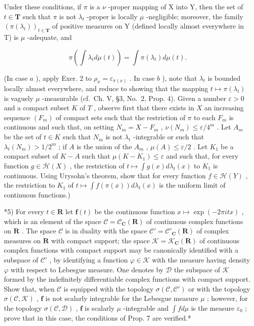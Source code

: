 Under these conditions, if \(\pi\) is a \(\nu\) -proper mapping of X into Y, then the set of \(t \in \mathbf{T}\) such that \(\pi\) is not \(\lambda_t\) -proper is locally \(\mu\) -negligible; moreover, the family \((\pi(\lambda_t))_{t \in \mathbf{T}}\) of positive measures on Y (defined locally almost everywhere in T) is \(\mu\) -adequate, and

\[
\pi \left(\int \lambda_ {t} d \mu (t)\right) = \int \pi (\lambda_ {t}) d \mu (t).
\]

(In case \(a\) ), apply Exer. 2 to \(\rho_x = \varepsilon_{\pi(x)}\) . In case \(b\) ), note that \(\lambda_t\) is bounded locally almost everywhere, and reduce to showing that the mapping \(t \mapsto \pi(\lambda_t)\) is vaguely \(\mu\) -measurable (cf.~Ch. V, §3, No.~2, Prop. 4). Given a number \(\varepsilon > 0\) and a compact subset \(K\) of \(T\) , observe first that there exists in \(X\) an increasing sequence \((F_m)\) of compact sets such that the restriction of \(\pi\) to each \(F_m\) is continuous and such that, on setting \(N_m = X - F_m\) , \(\nu(N_m) \leqslant \varepsilon/4^m\) . Let \(A_m\) be the set of \(t \in K\) such that \(N_m\) is not \(\lambda_t\) -integrable or such that \(\lambda_t(N_m) > 1/2^m\) ; if \(A\) is the union of the \(A_m\) , \(\mu(A) \leqslant \varepsilon/2\) . Let \(K_1\) be a compact subset of \(K - A\) such that \(\mu(K - K_1) \leqslant \varepsilon\) and such that, for every function \(g \in \mathcal{H}(X)\) , the restriction of \(t \mapsto \int g(x) d\lambda_t(x)\) to \(K_1\) is continuous. Using Urysohn's theorem, show that for every function \(f \in \mathcal{H}(Y)\) , the restriction to \(K_1\) of \(t \mapsto \int f(\pi(x)) d\lambda_t(x)\) is the uniform limit of continuous functions.)

*5) For every \(t \in \mathbf{R}\) let \(\mathbf{f}(t)\) be the continuous function \(x \mapsto \exp(-2\pi itx)\) , which is an element of the space \(\mathcal{C} = \mathcal{C}_{\mathbf{C}}(\mathbf{R})\) of continuous complex functions on \(\mathbf{R}\) . The space \(\mathcal{C}\) is in duality with the space \(\mathcal{C}' = \mathcal{C}'_{\mathbf{C}}(\mathbf{R})\) of complex measures on \(\mathbf{R}\) with compact support; the space \(\mathcal{K} = \mathcal{K}_{\mathbf{C}}(\mathbf{R})\) of continuous complex functions with compact support may be canonically identified with a subspace of \(\mathcal{C}'\) , by identifying a function \(\varphi \in \mathcal{K}\) with the measure having density \(\varphi\) with respect to Lebesgue measure. One denotes by \(\mathcal{D}\) the subspace of \(\mathcal{K}\) formed by the indefinitely differentiable complex functions with compact support. Show that, when \(\mathcal{C}\) is equipped with the topology \(\sigma(\mathcal{C},\mathcal{C}')\) or with the topology \(\sigma(\mathcal{C},\mathcal{K})\) , \(\mathbf{f}\) is not scalarly integrable for the Lebesgue measure \(\mu\) ; however, for the topology \(\sigma(\mathcal{C},\mathcal{D})\) , \(\mathbf{f}\) is scalarly \(\mu\) -integrable and \(\int f d\mu\) is the measure \(\varepsilon_0\) ; prove that in this case, the conditions of Prop. 7 are verified.*

